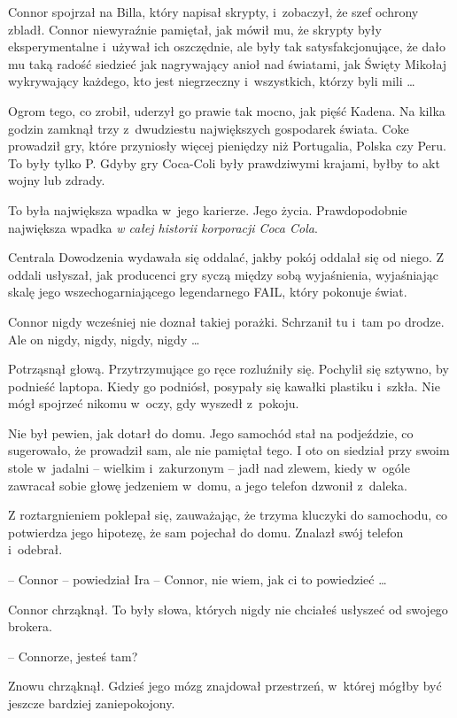 \documentclass[oneside,polish,11pt,rmheadings]{mwbk}
\begin{document}
Connor spojrzał na Billa, który napisał skrypty, i~zobaczył, że szef ochrony zbladł. Connor niewyraźnie pamiętał, jak mówił mu, że skrypty były eksperymentalne i~używał ich oszczędnie, ale były tak satysfakcjonujące, że dało mu taką radość siedzieć jak nagrywający anioł nad światami, jak Święty Mikołaj wykrywający każdego, kto jest niegrzeczny i~wszystkich, którzy byli mili \ldots 

Ogrom tego, co zrobił, uderzył go prawie tak mocno, jak pięść Kadena. Na kilka godzin zamknął trzy z~dwudziestu największych gospodarek świata. Coke prowadził gry, które przyniosły więcej pieniędzy niż Portugalia, Polska czy Peru. To były tylko P. Gdyby gry Coca-Coli były prawdziwymi krajami, byłby to akt wojny lub zdrady.

To była największa wpadka w~jego karierze. Jego życia. Prawdopodobnie największa wpadka \textit{w całej historii korporacji Coca Cola}.

Centrala Dowodzenia wydawała się oddalać, jakby pokój oddalał się od niego. Z oddali usłyszał, jak producenci gry syczą między sobą wyjaśnienia, wyjaśniając skalę jego wszechogarniającego legendarnego FAIL, który pokonuje świat.

Connor nigdy wcześniej nie doznał takiej porażki. Schrzanił tu i~tam po drodze. Ale on nigdy, nigdy, nigdy, nigdy \ldots 

Potrząsnął głową. Przytrzymujące go ręce rozluźniły się. Pochylił się sztywno, by podnieść laptopa. Kiedy go podniósł, posypały się kawałki plastiku i~szkła. Nie mógł spojrzeć nikomu w~oczy, gdy wyszedł z~pokoju.

Nie był pewien, jak dotarł do domu. Jego samochód stał na podjeździe, co sugerowało, że prowadził sam, ale nie pamiętał tego. I oto on siedział przy swoim stole w~jadalni -- wielkim i~zakurzonym -- jadł nad zlewem, kiedy w~ogóle zawracał sobie głowę jedzeniem w~domu, a jego telefon dzwonił z~daleka.

Z roztargnieniem poklepał się, zauważając, że trzyma kluczyki do samochodu, co potwierdza jego hipotezę, że sam pojechał do domu. Znalazł swój telefon i~odebrał.

-- Connor -- powiedział Ira -- Connor, nie wiem, jak ci to powiedzieć \ldots 

Connor chrząknął. To były słowa, których nigdy nie chciałeś usłyszeć od swojego brokera.

-- Connorze, jesteś tam?

Znowu chrząknął. Gdzieś jego mózg znajdował przestrzeń, w~której mógłby być jeszcze bardziej zaniepokojony.
\end{document}
